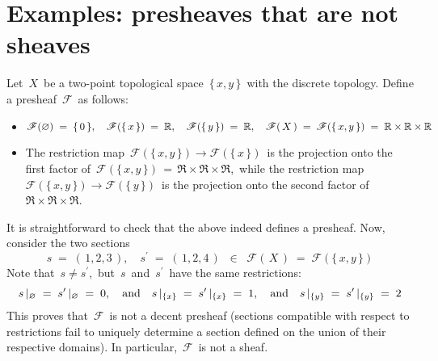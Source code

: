 

\section{Examples: presheaves that are not sheaves}


\renewcommand{\theenumi}{\roman{enumi}}
\renewcommand{\labelenumi}{\textnormal{(\theenumi)}$\;\;$}


\begin{example}
\mbox{}\vskip 0.1cm
\noindent
Let \,$X$\, be a two-point topological space \,$\{\,x,y\,\}$\, with the discrete topology.
Define a presheaf \,$\mathscr{F}$\, as follows:
\begin{itemize}
\item
	$
	\mathscr{F}(\varnothing) \;=\; \{\,0\,\},
	\quad
	\mathscr{F}(\{\,x\,\}) \;=\; \mathbb{R},
	\quad
	\mathscr{F}(\{\,y\,\}) \;=\; \mathbb{R},
	\quad
	\mathscr{F}(\,X\,) \;=\; \mathscr{F}(\{\,x,y\,\}) \;=\; \mathbb{R} \times \mathbb{R} \times \mathbb{R}
	$
\item
	The restriction map
	\,$\mathscr{F}(\{\,x,y\,\}) \longrightarrow \mathscr{F}(\{\,x\,\})$\,
	is the projection onto the first factor of
	\,$\mathscr{F}(\{\,x,y\,\}) \,=\, \Re \times \Re \times \Re$,\,
	while the restriction map
	\,$\mathscr{F}(\{\,x,y\,\}) \longrightarrow \mathscr{F}(\{\,y\,\})$\,
	is the projection onto the second factor of \,$\Re \times \Re \times \Re$.\,
\end{itemize}
It is straightforward to check that the above indeed defines a presheaf.
Now, consider the two sections
\begin{equation*}
s \;=\; (\,1,2,3\,), \quad s^{\prime} \;=\; (\,1,2,4\,) \;\;\in\;\; \mathscr{F}(\,X\,) \;=\; \mathscr{F}(\{\,x,y\,\})
\end{equation*}
Note that \,$s \neq s^{\prime}$,\, but \,$s$\, and \,$s^{\prime}$\, have the same restrictions:
\begin{equation*}
s\,\vert_{\varnothing} \;=\; s^{\prime}\,\vert_{\varnothing} \;=\; 0,
\quad\textnormal{and}\quad
s\,\vert_{\{x\}} \;=\; s^{\prime}\,\vert_{\{x\}} \;=\; 1,
\quad\textnormal{and}\quad
s\,\vert_{\{y\}} \;=\; s^{\prime}\,\vert_{\{y\}} \;=\; 2
\end{equation*}
This proves that \,$\mathscr{F}$\, is not a decent presheaf
(sections compatible with respect to restrictions fail to uniquely determine a section defined on the union of their respective domains).
In particular, \,$\mathscr{F}$\, is not a sheaf.
\end{example}

